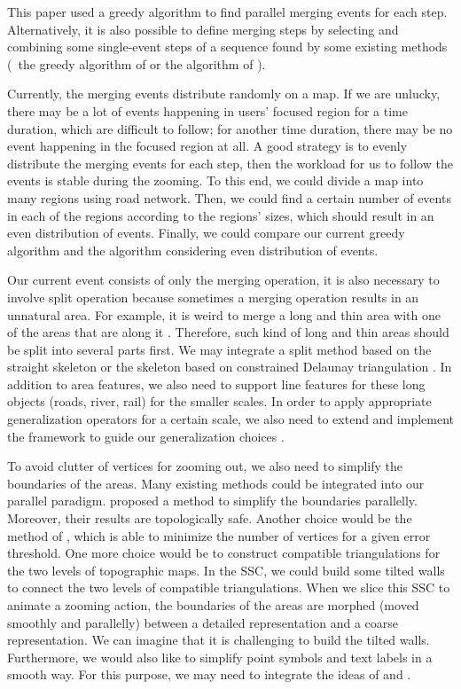 \documentclass[ijgi,article,submit,moreauthors,pdftex]{Definitions/mdpi}
\begin{document}
This paper used a greedy algorithm 
to find parallel merging events for each step.
Alternatively, it is also possible to define merging steps 
by selecting and combining some single-event steps of a sequence found 
by some existing methods
(\eg~the greedy algorithm of \citet{vanOosterom2005}
or the \Astar algorithm of \citet[]{Peng2019Thesis}).

Currently, the merging events distribute randomly on a map.
If we are unlucky, there may be a lot of events happening in users' focused region
for a time duration,
which are difficult to follow;
for another time duration, there may be no event happening in the focused region at all.
A good strategy is to evenly distribute the merging events for each step, 
then the workload for us to follow the events is stable during the zooming.
To this end, we could divide a map into many regions using road network.
Then, we could find a certain number of events in each of the regions according to
the regions' sizes,
which should result in an even distribution of events.
Finally, we could compare our current greedy algorithm and 
the algorithm considering even distribution of events.


Our current event consists of only the merging operation,
it is also necessary to involve split operation
because sometimes a merging operation results in an unnatural area.
For example, it is weird to merge a long and thin area 
with one of the areas that are along it
\citep[see][]{Haunert2008Skeleton}.
Therefore, such kind of long and thin areas should be
split into several parts first.
We may integrate a split method based on the straight skeleton
\citep{Haunert2008Skeleton}
or the skeleton based on constrained Delaunay triangulation
\citep{Meijers2016Split}.
In addition to area features, we also need to support line features 
for these long objects (roads, river, rail) for the smaller scales.
In order to apply appropriate generalization operators
for a certain scale,
we also need to extend and implement the framework 
to guide our generalization choices
\citep{Meijers2018Framework}.




To avoid clutter of vertices for zooming out, 
we also need to simplify the boundaries of the areas.
Many existing methods could be integrated into our parallel paradigm.
\citet{Meijers2011LineSimp} proposed a method 
to simplify the boundaries parallelly. 
Moreover, their results are topologically safe. 
Another choice would be the method of \citet{ImaiIri1988},
which is able to minimize the number of vertices 
for a given error threshold.
One more choice would be to construct compatible triangulations 
\citep[see][]{Peng2019Thesis}
for the two levels of topographic maps.
In the SSC, we could build some tilted walls 
to connect the two levels of compatible triangulations.
When we slice this SSC to animate a zooming action,
the boundaries of the areas are morphed (moved smoothly and parallelly)
between a detailed representation and a coarse representation.
We can imagine that it is challenging to build the tilted walls.
Furthermore, we would also like to simplify point symbols and text labels
in a smooth way.
For this purpose, we may need to integrate the ideas of
\citet{Haunert2017Label} and \citet{sahw-oarps-ICAGW13}.
\end{document}
